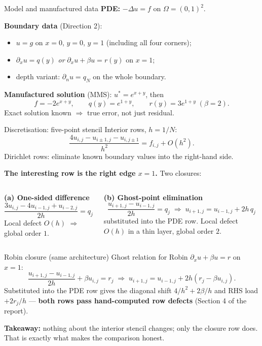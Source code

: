 \documentclass[aspectratio=169,11pt]{beamer}
\begin{document}
\begin{frame}{Model and manufactured data}
\textbf{PDE:} $-\Delta u = f$ on $\Omega=(0,1)^2$.

\textbf{Boundary data} (Direction 2):
\begin{itemize}
\item $u=g$ on $x=0$, $y=0$, $y=1$ (including all four corners);
\item $\partial_x u = q(y)$ \emph{or} $\partial_x u + \beta u = r(y)$ on $x=1$;
\item depth variant: $\partial_n u = q_N$ on the whole boundary.
\end{itemize}

\textbf{Manufactured solution} (MMS): $u^\ast=e^{x+y}$, then
\[
f=-2e^{x+y},\qquad
q(y)=e^{1+y},\qquad
r(y)=3e^{1+y}\;(\beta=2).
\]
Exact solution known $\Rightarrow$ true error, not just residual.
\end{frame}

\begin{frame}{Discretisation: five-point stencil}
Interior rows, $h=1/N$:
\[
\frac{4u_{i,j}-u_{i\pm1,j}-u_{i,j\pm1}}{h^{2}} = f_{i,j} + O(h^{2}).
\]
Dirichlet rows: eliminate known boundary values into the right-hand side.

\bigskip
\textbf{The interesting row is the right edge $x=1$.} Two closures:

\bigskip
\begin{columns}[T]
\textbf{(a) One-sided difference}
\[
\frac{3u_{i,j}-4u_{i-1,j}+u_{i-2,j}}{2h} = q_j
\]
Local defect $O(h)$ $\Rightarrow$ global order $1$.

\textbf{(b) Ghost-point elimination}
\[
\frac{u_{i+1,j}-u_{i-1,j}}{2h}=q_j
\;\Rightarrow\;
u_{i+1,j}=u_{i-1,j}+2h\,q_j
\]
substituted into the PDE row. Local defect $O(h)$ in a thin layer,
global order $2$.
\end{columns}
\end{frame}

\begin{frame}{Robin closure (same architecture)}
Ghost relation for Robin $\partial_x u + \beta u = r$ on $x=1$:
\[
\frac{u_{i+1,j}-u_{i-1,j}}{2h} + \beta u_{i,j} = r_j
\;\Rightarrow\;
u_{i+1,j}=u_{i-1,j}+2h(r_j-\beta u_{i,j}).
\]
Substituted into the PDE row gives the diagonal shift $4/h^{2}+2\beta/h$
and RHS load $+2r_j/h$ --- \textbf{both rows pass hand-computed row
defects} (Section 4 of the report).

\bigskip
\textbf{Takeaway:} nothing about the interior stencil changes; only the
closure row does. That is exactly what makes the comparison honest.
\end{frame}
\end{document}
